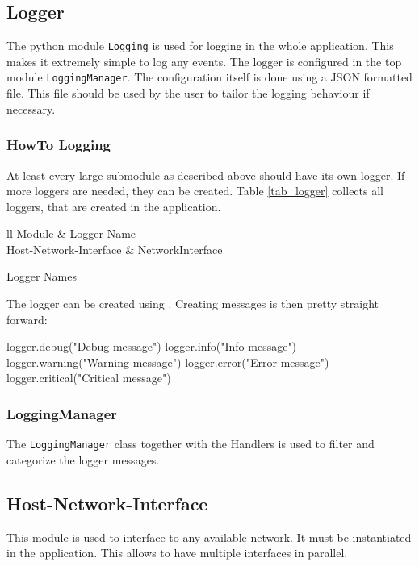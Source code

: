 \FloatBarrier
\subsection{Logger}
The python module \texttt{Logging} is used for logging in the whole application. This makes it extremely simple to log any events. The logger is configured in the top module \texttt{LoggingManager}. The configuration itself is done using a \ac{JSON} formatted file. This file should be used by the user to tailor the logging behaviour if necessary. 
\subsubsection{HowTo Logging}
At least every large submodule as described above should have its own logger. If more loggers are needed, they can be created. Table  \ref{tab_logger} collects all loggers, that are created in the application. 
\begin{table}[h!]
	\centering
	\begin{zebratabular}{ll}
		Module &
		Logger Name \\
		Host-Network-Interface & NetworkInterface  \\
	\end{zebratabular}
	\caption{Logger Names}
	\label{tab_logger}
\end{table}

The logger can be created using . Creating messages is then pretty straight forward: 
\begin{python}
logger.debug("Debug message")
logger.info("Info message")
logger.warning("Warning message")
logger.error("Error message")
logger.critical("Critical message")
\end{python}

\subsubsection{LoggingManager}
The \texttt{LoggingManager} class together with the Handlers is used to filter and categorize the logger messages. 

\subsection{Host-Network-Interface}

This module is used to interface to any available network. It must be instantiated in the application. This allows to have multiple interfaces in parallel.

